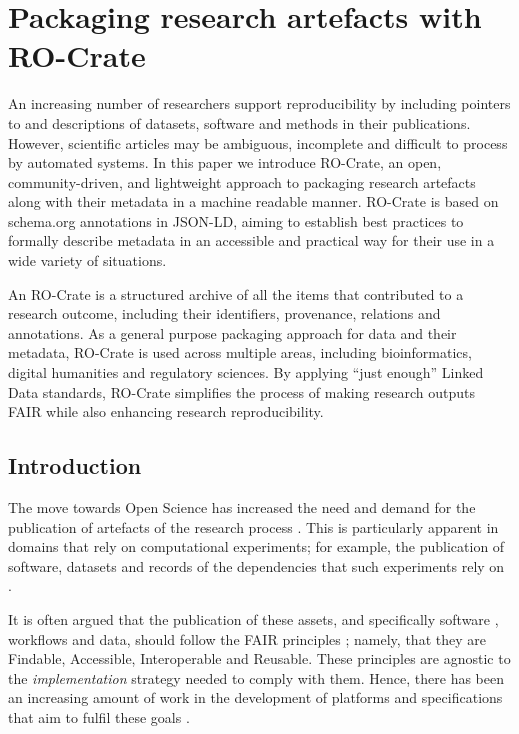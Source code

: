 \section{Packaging research artefacts with RO-Crate}
\label{ch5:packaging-research-artefacts-with-ro-crate}

An increasing number of researchers support reproducibility by including
pointers to and descriptions of datasets, software and methods in their
publications. However, scientific articles may be ambiguous, incomplete
and difficult to process by automated systems. In this paper we
introduce RO-Crate, an open, community-driven, and lightweight approach
to packaging research artefacts along with their metadata in a machine
readable manner. RO-Crate is based on schema.org annotations in JSON-LD,
aiming to establish best practices to formally describe metadata in an
accessible and practical way for their use in a wide variety of
situations.

An RO-Crate is a structured archive of all the items that contributed to
a research outcome, including their identifiers, provenance, relations
and annotations. As a general purpose packaging approach for data and
their metadata, RO-Crate is used across multiple areas, including
bioinformatics, digital humanities and regulatory sciences. By applying
``just enough'' Linked Data standards, RO-Crate simplifies the process
of making research outputs FAIR while also enhancing research
reproducibility.

\subsection{Introduction}\label{ch5:introduction}

The move towards Open Science has increased the need and demand for the
publication of artefacts of the research process
\cite{Sefton 2021}. This is
particularly apparent in domains that rely on computational experiments;
for example, the publication of software, datasets and records of the
dependencies that such experiments rely on
\cite{Stodden 2016}.

It is often argued that the publication of these assets, and
specifically software
\cite{Lamprecht 2019}, workflows
\cite{Goble 2020} and data, should
follow the FAIR principles
\cite{Wilkinson 2016}; namely, that
they are Findable, Accessible, Interoperable and Reusable. These
principles are agnostic to the \emph{implementation} strategy needed to
comply with them. Hence, there has been an increasing amount of work in
the development of platforms and specifications that aim to fulfil these
goals \cite{ch5-91}.

